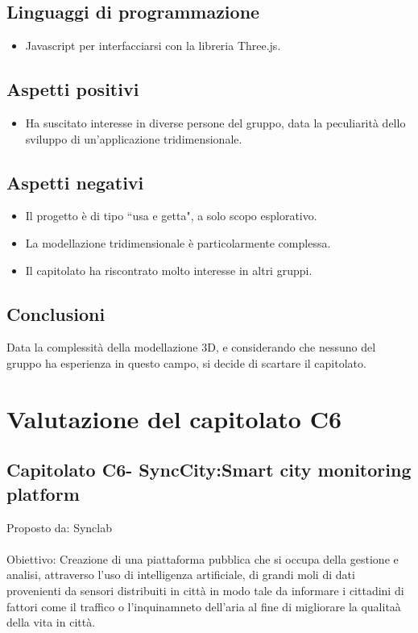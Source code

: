 \documentclass{article}
\begin{document}
\subsection{Linguaggi di programmazione}
\begin{itemize}
    \item Javascript per interfacciarsi con la libreria Three.js.
\end{itemize}
\subsection{Aspetti positivi}
\begin{itemize}
    \item Ha suscitato interesse in diverse persone del gruppo, data la peculiarità dello sviluppo di un'applicazione tridimensionale.
\end{itemize}
\subsection{Aspetti negativi}
\begin{itemize}
    \item Il progetto è di tipo ``usa e getta", a solo scopo esplorativo.
    \item La modellazione tridimensionale è particolarmente complessa.
    \item Il capitolato ha riscontrato molto interesse in altri gruppi.
\end{itemize}
\subsection{Conclusioni}
Data la complessità della modellazione 3D, e considerando che nessuno del gruppo ha esperienza in questo campo, si decide di scartare il capitolato.
\section{Valutazione del capitolato C6}
\subsection{Capitolato C6- SyncCity:Smart city monitoring platform}
Proposto da: Synclab\\ \\
Obiettivo: Creazione di una piattaforma pubblica che si occupa della gestione e analisi, attraverso l'uso di intelligenza artificiale, di grandi moli di dati provenienti da sensori distribuiti in città in modo tale da informare i cittadini di fattori come il traffico o l'inquinamneto dell'aria  al fine di migliorare la qualitaà della vita in città.
\end{document}
